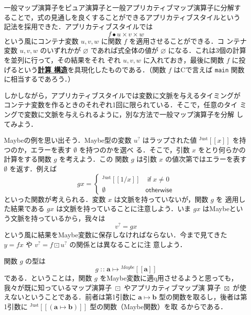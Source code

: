 \documentclass[a5paper,twoside,fleqn]{jsbook}
\def\[{\left[\!\left[}
\def\]{\right]\!\right]}
\newcommand{\programminglanguage}[1]{\textsf{#1}}
\newcommand{\clang}{\programminglanguage{C}}
\newcommand{\keyword}[1]{{\underline{\textbf{#1}}}}
\newcommand{\code}[1]{\texttt{#1}}
\newcommand{\mKeyword}[1]{\mathsf{#1}} %
\newcommand{\mIfKeyword}{\mKeyword{if}}
\newcommand{\mOtherwiseKeyword}{\mKeyword{otherwise}}
\DeclareMathOperator{\mIf}{\mIfKeyword}
\DeclareMathOperator{\mOtherwise}{\mOtherwiseKeyword}
\newcommand{\mNothing}{\emptyset}
\newcommand{\mPureNothing}{\varnothing}
\DeclareMathOperator{\mAppMap}{\times}
\DeclareMathOperator{\mAppMapMaybe}{\boxtimes}
\DeclareMathOperator{\mIn}{{:\!:}}
\DeclareMathOperator{\mMap}{\bullet}
\DeclareMathOperator{\mMapMaybe}{\boxdot}
\DeclareMathOperator{\mMapsTo}{\mapsto}
\newcommand{\mType}[1]{\mathbf{#1}}
\newcommand{\mGenericTypeAssemble}[2]{{}^{\mTypeConstructor{#1}}\[\mType{#2}\]}
\newcommand{\mMaybeType}[1]{\mGenericTypeAssemble{Maybe}{#1}}
\newcommand{\mTypeConstructor}[1]{\textit{#1}}
\newcommand{\mGenericValueConstructor}[1]{\mathrm{#1}}
\newcommand{\mGenericWith}[2]{{}^\mGenericValueConstructor{#1}\[#2\]}
\newcommand{\mJustWith}[1]{\mGenericWith{Just}{#1}}
\newcommand{\mMaybe}[1]{{#1}^?}
\newcommand{\mProj}[2]{#1\mMapsTo#2}
\begin{document}
一般マップ演算子をピュア演算子と一般アプリカティブマップ演算子に分解す
ることで，式の見通しを良くすることができるアプリカティブスタイルという
記法を採用できた．アプリカティブスタイルでは
\begin{equation}
f\mMap u\mAppMap v\mAppMap w
\end{equation}
という風にコンテナ変数 $u,v,w$ に関数 $f$ を適用させることができる．コ
ンテナ変数 $u,v,w$ のいずれかが $\mPureNothing$ であれば式全体の値が
$\mPureNothing$ になる．これは3個の計算を並列に行って，その結果をそれ
ぞれ $u,v,w$ に入れておき，最後に関数 $f$ に投げるという\keyword{計算
構造}を具現化したものである．（関数 $f$ は\clang で言えば
\code{main} 関数に相当するであろう．）

しかしながら，アプリカティブスタイルでは変数に文脈を与えるタイミングが
コンテナ変数を作るときのそれぞれ1回に限られている．そこで，任意のタイ
ミングで変数に文脈を与えられるように，別な方法で一般マップ演算子を分解
してみよう．

Maybeの例を思い出そう．Maybe型の変数 $\mMaybe{u}$ はラップされた値
$\mJustWith{x}$ を持つのか，エラーを表す $\mNothing$ を持つのかを選べ
る．そこで，引数 $x$ をとり何らかの計算をする関数 $g$ を考えよう．この
関数 $g$ は引数 $x$ の値次第ではエラーを表す $\mNothing$ を返す．例えば
\begin{equation}
gx=\begin{cases}
\mJustWith{1/x}&\mIf x\neq0\\
\mNothing&\mOtherwise
\end{cases}
\end{equation}
といった関数が考えられる．変数 $x$ は文脈を持っていないが，関数 $g$ を
適用した結果である $gx$ は文脈を持っていることに注意しよう．いま $gx$
はMaybeという文脈を持っているから，我々は
\begin{equation}
\mMaybe{v}=gx
\end{equation}
という風に結果をMaybe変数に保存しなければならない．今まで見てきた
$y=fx$ や $\mMaybe{v}=f\mMapMaybe\mMaybe{u}$ の関係とは異なることに注
意しよう．

関数 $g$ の型は
\begin{equation}
g\mIn\mProj{\mType{a}}{\mMaybeType{a}}
\end{equation}
である．ということは，関数 $g$ をMaybe変数に適q用させるようと思っても，
我々が既に知っているマップ演算子 $\mMapMaybe$ やアプリカティブマップ演
算子 $\mAppMapMaybe$ が使えないということである．前者は第1引数に
$\mProj{\mType{a}}{\mType{b}}$ 型の関数を取るし，後者は第1引数に
$\mJustWith{(\mProj{\mType{a}}{\mType{b}})}$ 型の関数（Maybe関数）を取
るからである．
\end{document}
